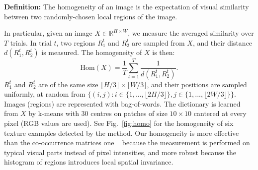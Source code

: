 \documentclass[10pt,twocolumn,letterpaper]{article}
\begin{document}
\noindent 
\textbf{Definition:} The homogeneity of an image is the expectation of
visual similarity between two randomly-chosen local regions of the image.

In particular, given an image
$X \in \mathbb{R}^{H\times W}$, we measure the averaged similarity over $T$ trials. 
In trial $t$, two regions $R_1^t$
and $R_2^t$ are sampled from $X$, and their distance
$d(R_1^t, R_2^t)$ is measured. The homogeneity of $X$ is then:
\begin{equation}
  \label{eq:repet}
\text{Hom}(X) = \frac{1}{T}\sum_{t=1}^T \frac{1}{d(R_1^t, R_2^t)}.  
\end{equation}
$R_1^t$ and $R_2^t$ are of the same size $\lfloor H/3 \rfloor \times \lfloor W/3 \rfloor$, and their
positions are sampled uniformly, at random from $\{(i,j): i\in\{1,
..., \lfloor 2H/3 \rfloor \}, j\in \{1, ..., \lfloor 2W/3 \rfloor \} \}$. Images (regions) are
represented with bag-of-words. The dictionary is learned from $X$ by
k-means with $30$ centres on patches of size $10\times 10$ cantered at
every pixel (RGB values are used). See Fig.~\ref{fig:homo} 
for the homogeneity of six texture examples detected by the method.
Our homogeneity is more effective than the co-occurrence matrices one ~\cite{texture:analysis} because 
the measurement is performed on typical visual parts instead of pixel intensities, 
and more robust because the histogram of regions introduces local spatial invariance. 
 
\end{document}

